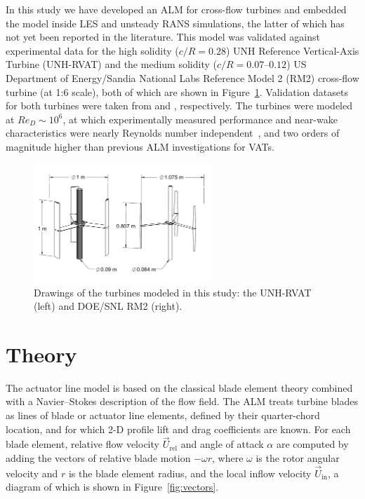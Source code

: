 \documentclass[times]{weauth}
\begin{document}
In this study we have developed an ALM for cross-flow turbines and embedded the
model inside LES and unsteady RANS simulations, the latter of which has not yet
been reported in the literature. This model was validated against experimental
data for the high solidity ($c/R=0.28$) UNH Reference Vertical-Axis Turbine
(UNH-RVAT) and the medium solidity ($c/R=0.07$--$0.12$) US Department of
Energy/Sandia National Labs Reference Model 2 (RM2) cross-flow turbine (at 1:6
scale), both of which are shown in Figure~\ref{fig:turbines}. Validation
datasets for both turbines were taken from \cite{Bachant2016-RVAT-Re-dep} and
\cite{Bachant2016-RM2-data}, respectively. The turbines were modeled at $Re_D
\sim 10^6$, at which experimentally measured performance and near-wake
characteristics were nearly Reynolds number
independent~\cite{Bachant2016-Energies,Bachant2016-RM2-paper}, and two orders of
magnitude higher than previous ALM investigations for VATs.


\begin{figure}
    \centering

    \includegraphics[width=0.6\textwidth]{turbines}

    \caption{Drawings of the turbines modeled in this study: the UNH-RVAT (left)
    and DOE/SNL RM2 (right).}

    \label{fig:turbines}
\end{figure}


\section{Theory}

The actuator line model is based on the classical blade element theory combined
with a Navier--Stokes description of the flow field. The ALM treats turbine
blades as lines of blade or actuator line elements, defined by their
quarter-chord location, and for which 2-D profile lift and drag coefficients are
known. For each blade element, relative flow velocity $\vec{U}_\mathrm{rel}$ and
angle of attack $\alpha$ are computed by adding the vectors of relative blade
motion $-\omega r$, where $\omega$ is the rotor angular velocity and $r$ is the
blade element radius, and the local inflow velocity $\vec{U}_\mathrm{in}$, a
diagram of which is shown in Figure~\ref{fig:vectors}.
\end{document}
